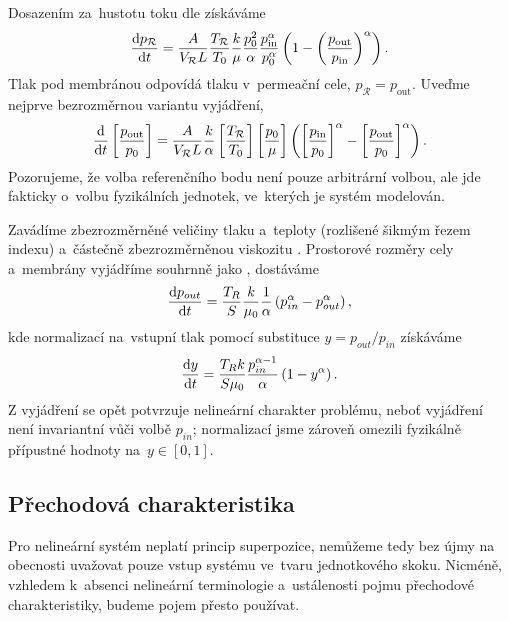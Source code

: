 Dosazením za~hustotu toku dle 
 získáváme
\begin{equation}\label{eq:unitless_nonnormalized_system}
    \frac{\mathrm{d} p_{\mathcal{R}}}{\mathrm{d} t}
    =\frac{A}{V_{\mathcal{R}}L}\frac{T_{\mathcal{R}}}{T_0}\frac{k}{\mu}\frac{p_0^{2}}{\alpha}\frac{p_{\mathrm{in}}^{\alpha}}{p_0^{\alpha}}\left(1-\left(\frac{p_{\mathrm{out}}}{p_{\mathrm{in}}}\right)^{\alpha}\right).
\end{equation}
Tlak pod membránou odpovídá tlaku v~permeační cele, $p_{\mathcal{R}}=p_{\mathrm{out}}$. Uveďme nejprve bezrozměrnou variantu vyjádření,
\begin{equation}
    \frac{\mathrm{d} }{\mathrm{d} t}\left[\frac{p_{\mathrm{out}}}{p_0}\right]=\frac{A}{V_{\mathcal{R}}L}\frac{k}{\alpha}\left[\frac{T_{\mathcal{R}}}{T_0}\right]\left[\frac{p_0}{\mu}\right]\left(\left[\frac{p_{\mathrm{in}}}{p_0}\right]^{\alpha}-\left[\frac{p_{\mathrm{out}}}{p_0}\right]^{\alpha}\right).
\end{equation}
Pozorujeme, že volba referenčního bodu není pouze arbitrární volbou, ale jde fakticky o~volbu fyzikálních jednotek, ve~kterých je systém modelován.

Zavádíme zbezrozměrněné veličiny tlaku a~teploty  (rozlišené šikmým řezem indexu) a~částečně zbezrozměrněnou viskozitu . Prostorové rozměry cely a~membrány vyjádříme souhrnně jako , dostáváme
\begin{equation}
    \frac{\mathrm{d} p_{out}}{\mathrm{d} t}=\frac{T_R}{S}\frac{k}{\mu_0}\frac{1}{\alpha}\left(p_{in}^\alpha-p_{out}^{\alpha}\right),
\end{equation}
kde normalizací na~vstupní tlak pomocí substituce $y=p_{out}/p_{in}$ získáváme
\begin{equation}
\frac{\mathrm{d} y}{\mathrm{d} t}=\frac{T_R k}{S \mu_0}\frac{p_{in}^{\alpha-1}}{\alpha}\left(1-y^\alpha\right).
\end{equation}
Z vyjádření se opět potvrzuje nelineární charakter problému, neboť vyjádření není invariantní vůči volbě $p_{in}$; normalizací jsme zároveň omezili fyzikálně přípustné hodnoty na~$y\in\left[0,1\right]$.

\subsection{Přechodová charakteristika}\label{ss:prechodova_charakteristika}
Pro nelineární systém neplatí princip superpozice, nemůžeme tedy bez újmy na obecnosti uvažovat pouze vstup systému ve~tvaru jednotkového skoku. Nicméně, vzhledem k~absenci nelineární terminologie a~ustálenosti pojmu přechodové charakteristiky, budeme pojem přesto používat.

